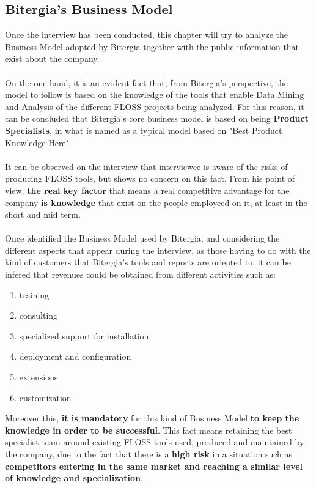 \documentclass[11pt]{article}
\begin{document}
\subsection{Bitergia's Business Model}
Once the interview has been conducted, this chapter will try to analyze the Business Model adopted by Bitergia together with the public information that exist about the company.\\
\\
On the one hand, it is an evident fact that, from Bitergia's perspective, the model to follow is based on the knowledge of the tools that enable Data Mining and Analysis of the different FLOSS projects being analyzed. For this reason, it can be concluded that Bitergia's core business model is based on being \textbf{Product Specialists}, in what is named as a typical model based on "Best Product Knowledge Here".\\
\\
It can be observed on the interview that interviewee is aware of the risks of producing FLOSS tools, but shows no concern on this fact. From his point of view, \textbf{the real key factor} that means a real competitive advantage for the company \textbf{is knowledge} that exist on the people employeed on it, at least in the short and mid term.\\
\\
Once identified the Business Model used by Bitergia, and considering the different aspects that appear during the interview, as those having to do with the kind of customers that Bitergia's tools and reports are oriented to, it can be infered that revenues could be obtained from different activities such as:
\begin{enumerate}\itemsep0.2pt
\item {training}
\item {consulting}
\item {specialized support for
installation}
\item {deployment and configuration}
\item {extensions}
\item {customization}
\end{enumerate}
Moreover this, \textbf{it is mandatory} for this kind of Business Model \textbf{to keep the knowledge in order to be successful}. This fact means retaining the best specialist team around existing FLOSS tools used, produced and maintained by the company, due to the fact that there is a \textbf{high risk} in a situation such as \textbf{competitors entering in the same market and reaching a similar level of knowledge and specialization}.
\end{document}
